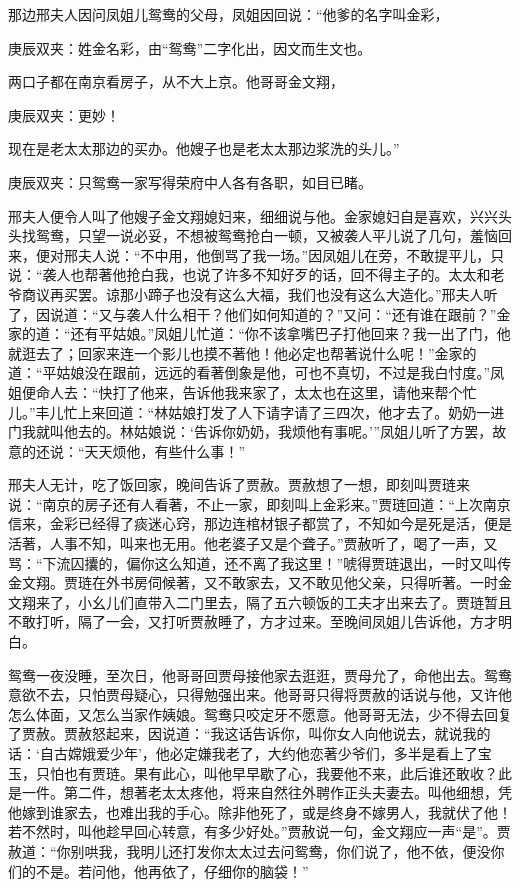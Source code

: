 \begin{parag}
    那边邢夫人因问凤姐儿鸳鸯的父母，凤姐因回说：“他爹的名字叫金彩，\begin{note}庚辰双夹：姓金名彩，由“鸳鸯”二字化出，因文而生文也。\end{note}两口子都在南京看房子，从不大上京。他哥哥金文翔，\begin{note}庚辰双夹：更妙！\end{note}现在是老太太那边的买办。他嫂子也是老太太那边浆洗的头儿。”\begin{note}庚辰双夹：只鸳鸯一家写得荣府中人各有各职，如目已睹。\end{note}邢夫人便令人叫了他嫂子金文翔媳妇来，细细说与他。金家媳妇自是喜欢，兴兴头头找鸳鸯，只望一说必妥，不想被鸳鸯抢白一顿，又被袭人平儿说了几句，羞恼回来，便对邢夫人说：“不中用，他倒骂了我一场。”因凤姐儿在旁，不敢提平儿，只说：“袭人也帮著他抢白我，也说了许多不知好歹的话，回不得主子的。太太和老爷商议再买罢。谅那小蹄子也没有这么大福，我们也没有这么大造化。”邢夫人听了，因说道：“又与袭人什么相干？他们如何知道的？”又问：“还有谁在跟前？”金家的道：“还有平姑娘。”凤姐儿忙道：“你不该拿嘴巴子打他回来？我一出了门，他就逛去了；回家来连一个影儿也摸不著他！他必定也帮著说什么呢！”金家的道：“平姑娘没在跟前，远远的看著倒象是他，可也不真切，不过是我白忖度。”凤姐便命人去：“快打了他来，告诉他我来家了，太太也在这里，请他来帮个忙儿。”丰儿忙上来回道：“林姑娘打发了人下请字请了三四次，他才去了。奶奶一进门我就叫他去的。林姑娘说：‘告诉你奶奶，我烦他有事呢。’”凤姐儿听了方罢，故意的还说：“天天烦他，有些什么事！”
\end{parag}


\begin{parag}
    邢夫人无计，吃了饭回家，晚间告诉了贾赦。贾赦想了一想，即刻叫贾琏来说：“南京的房子还有人看著，不止一家，即刻叫上金彩来。”贾琏回道：“上次南京信来，金彩已经得了痰迷心窍，那边连棺材银子都赏了，不知如今是死是活，便是活著，人事不知，叫来也无用。他老婆子又是个聋子。”贾赦听了，喝了一声，又骂：“下流囚攮的，偏你这么知道，还不离了我这里！”唬得贾琏退出，一时又叫传金文翔。贾琏在外书房伺候著，又不敢家去，又不敢见他父亲，只得听著。一时金文翔来了，小幺儿们直带入二门里去，隔了五六顿饭的工夫才出来去了。贾琏暂且不敢打听，隔了一会，又打听贾赦睡了，方才过来。至晚间凤姐儿告诉他，方才明白。
\end{parag}


\begin{parag}
    鸳鸯一夜没睡，至次日，他哥哥回贾母接他家去逛逛，贾母允了，命他出去。鸳鸯意欲不去，只怕贾母疑心，只得勉强出来。他哥哥只得将贾赦的话说与他，又许他怎么体面，又怎么当家作姨娘。鸳鸯只咬定牙不愿意。他哥哥无法，少不得去回复了贾赦。贾赦怒起来，因说道：“我这话告诉你，叫你女人向他说去，就说我的话：‘自古嫦娥爱少年’，他必定嫌我老了，大约他恋著少爷们，多半是看上了宝玉，只怕也有贾琏。果有此心，叫他早早歇了心，我要他不来，此后谁还敢收？此是一件。第二件，想著老太太疼他，将来自然往外聘作正头夫妻去。叫他细想，凭他嫁到谁家去，也难出我的手心。除非他死了，或是终身不嫁男人，我就伏了他！若不然时，叫他趁早回心转意，有多少好处。”贾赦说一句，金文翔应一声“是”。贾赦道：“你别哄我，我明儿还打发你太太过去问鸳鸯，你们说了，他不依，便没你们的不是。若问他，他再依了，仔细你的脑袋！”
\end{parag}


